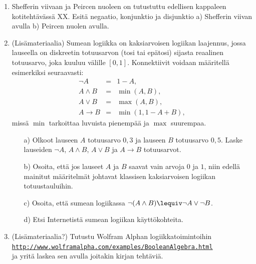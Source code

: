 \begin{enumerate}
\item Shefferin viivaan ja Peircen nuoleen on tutustuttu
edellisen kappaleen kotitehtävässä XX. Esitä negaatio,
konjunktio ja disjunktio a) Shefferin viivan avulla b)
Peircen nuolen avulla.

\item (Lisämateriaalia) Sumean logiikka on kaksiarvoisen logiikan
laajennus, jossa lauseella on diskreetin totuusarvon
(tosi tai epätosi) sijasta reaalinen totuusarvo, joka
kuuluu välille $[0,1]$. Konnektiivit voidaan määritellä
esimerkiksi seuraavasti:
\[
\begin{array}{rcl}
\lnot A &=& 1-A,\\
A\land B &=& \min(A,B),\\
A\lor B &=& \max(A,B),\\
A\to B
&=& \min(1,1-A+B),
\end{array}
\]
missä $\min$ tarkoittaa luvuista pienempää ja $\max$
suurempaa.

\begin{itemize}
\item[a)] Olkoot lauseen $A$ totuusarvo $0,3$ ja lauseen
$B$ totuusarvo $0,5$. Laske lauseiden $\lnot A$, $A\land
B$, $A\lor B$ ja $A \to B$ totuusarvot.
\item[b)] Osoita, että jos lauseet $A$ ja $B$ saavat
vain arvoja $0$ ja $1$, niin edellä mainitut määritelmät johtavat
klassisen kaksiarvoisen logiikan totuustauluihin.
\item[c)] Osoita, että sumean logiikassa $\lnot(A\land B)
\lequiv \lnot A \lor \lnot B$.
\item[d)] Etsi Internetistä sumean logiikan
käyttökohteita.
\end{itemize}

\item (Lisämateriaalia?) Tutustu Wolfram Alphan
logiikkatoimintoihin\\
\href{http://www.wolframalpha.com/examples/BooleanAlgebra.html}{{\tt http://www.wolframalpha.com/examples/BooleanAlgebra.html}}\\
ja yritä laskea sen avulla joitakin kirjan tehtäviä.


\end{enumerate}
